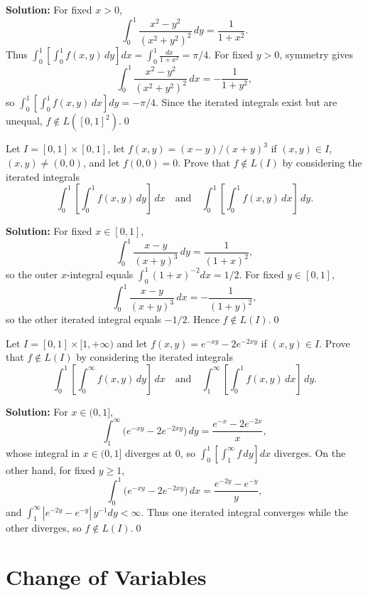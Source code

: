 \noindent\textbf{Solution:}
For fixed \(x>0\),
\[
\int_0^1 \frac{x^2-y^2}{(x^2+y^2)^2}\,dy = \frac{1}{1+x^2}.
\]
Thus \(\int_0^1[\int_0^1 f(x,y)\,dy]dx=\int_0^1\!\frac{dx}{1+x^2}=\pi/4\). For fixed \(y>0\), symmetry gives
\[
\int_0^1 \frac{x^2-y^2}{(x^2+y^2)^2}\,dx = -\frac{1}{1+y^2},
\]
so \(\int_0^1[\int_0^1 f(x,y)\,dx]dy=-\pi/4\). Since the iterated integrals exist but are unequal, \(f\notin L([0,1]^2)\).\qed


\begin{problembox}
Let \( I = [0, 1] \times [0, 1] \), let \( f(x, y) = (x - y)/(x + y)^3 \) if \( (x, y) \in I \), \( (x, y) \neq (0, 0) \), and let \( f(0, 0) = 0 \). Prove that \( f \notin L(I) \) by considering the iterated integrals
\[
\int_0^1 \left[ \int_0^1 f(x, y) \, dy \right] \, dx \quad \text{and} \quad \int_0^1 \left[ \int_0^1 f(x, y) \, dx \right] \, dy.
\]
\end{problembox}

\noindent\textbf{Solution:}
For fixed \(x\in[0,1]\),
\[
\int_0^1 \frac{x-y}{(x+y)^3}\,dy = \frac{1}{(1+x)^{2}},
\]
so the outer \(x\)-integral equals \(\int_0^1 (1+x)^{-2}dx=1/2\). For fixed \(y\in[0,1]\),
\[
\int_0^1 \frac{x-y}{(x+y)^3}\,dx = -\frac{1}{(1+y)^{2}},
\]
so the other iterated integral equals \(-1/2\). Hence \(f\notin L(I)\).\qed


\begin{problembox}
Let \( I = [0, 1] \times [1, +\infty) \) and let \( f(x, y) = e^{-xy} - 2e^{-2xy} \) if \( (x, y) \in I \). Prove that \( f \notin L(I) \) by considering the iterated integrals
\[
\int_0^1 \left[ \int_0^\infty f(x, y) \, dy \right] \, dx \quad \text{and} \quad \int_1^\infty \left[ \int_0^1 f(x, y) \, dx \right] \, dy.
\]
\end{problembox}

\noindent\textbf{Solution:}
For \(x\in(0,1]\),
\[
\int_1^{\infty} \big(e^{-xy}-2e^{-2xy}\big)\,dy = \frac{e^{-x}-2e^{-2x}}{x},
\]
whose integral in \(x\in(0,1]\) diverges at 0, so \(\int_0^1[\int_1^{\infty} f\,dy]dx\) diverges. On the other hand, for fixed \(y\ge 1\),
\[
\int_0^1 \big(e^{-xy}-2e^{-2xy}\big)\,dx = \frac{e^{-2y}-e^{-y}}{y},
\]
and \(\int_1^{\infty} |e^{-2y}-e^{-y}|\,y^{-1} dy<\infty\). Thus one iterated integral converges while the other diverges, so \(f\notin L(I)\).\qed
\section{Change of Variables}

